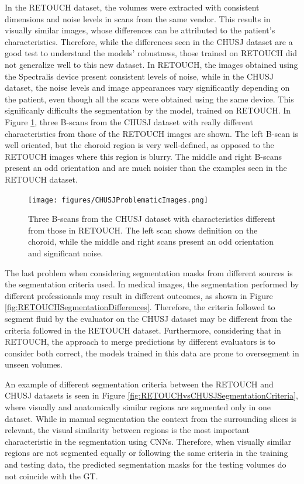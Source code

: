 In the RETOUCH dataset, the volumes were extracted with consistent dimensions and noise levels in scans from the same vendor. This results in visually similar images, whose differences can be attributed to the patient's characteristics. Therefore, while the differences seen in the CHUSJ dataset are a good test to understand the models' robustness, those trained on RETOUCH did not generalize well to this new dataset. In RETOUCH, the images obtained using the Spectralis device present consistent levels of noise, while in the CHUSJ dataset, the noise levels and image appearances vary significantly depending on the patient, even though all the scans were obtained using the same device. This significanly difficults the segmentation by the model, trained on RETOUCH. In Figure \ref{fig:CHUSJProblematicImages}, three B-scans from the CHUSJ dataset with really different characteristics from those of the RETOUCH images are shown. The left B-scan is well oriented, but the choroid region is very well-defined, as opposed to the RETOUCH images where this region is blurry. The middle and right B-scans present an odd orientation and are much noisier than the examples seen in the RETOUCH dataset.

\begin{figure}[!ht]
	\centering
	\texttt{[image: figures/CHUSJProblematicImages.png]}
	\caption{Three B-scans from the CHUSJ dataset with characteristics different from those in RETOUCH. The left scan shows definition on the choroid, while the middle and right scans present an odd orientation and significant noise.}
	\label{fig:CHUSJProblematicImages}
\end{figure}

The last problem when considering segmentation masks from different sources is the segmentation criteria used. In medical images, the segmentation performed by different professionals may result in different outcomes, as shown in Figure \ref{fig:RETOUCHSegmentationDifferences}. Therefore, the criteria followed to segment fluid by the evaluator on the CHUSJ dataset may be different from the criteria followed in the RETOUCH dataset. Furthermore, considering that in RETOUCH, the approach to merge predictions by different evaluators is to consider both correct, the models trained in this data are prone to oversegment in unseen volumes.
\par
An example of different segmentation criteria between the RETOUCH and CHUSJ datasets is seen in Figure \ref{fig:RETOUCHvsCHUSJSegmentationCriteria}, where visually and anatomically similar regions are segmented only in one dataset. While in manual segmentation the context from the surrounding slices is relevant, the visual similarity between regions is the most important characteristic in the segmentation using CNNs. Therefore, when visually similar regions are not segmented equally or following the same criteria in the training and testing data, the predicted segmentation masks for the testing volumes do not coincide with the GT.

